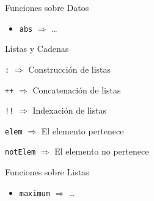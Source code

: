 \begin{frame}[fragile]{Funciones sobre Datos}
    \begin{itemize}
        \item \verb|abs| $\Rightarrow$ \dots
    \end{itemize}
\end{frame}

\begin{frame}[fragile]{Listas y Cadenas}
    \item \verb|:| $\Rightarrow$ Construcción de listas
    \item \verb|++| $\Rightarrow$ Concatenación de listas
    \item \verb|!!| $\Rightarrow$ Indexación de listas
    \item \verb|elem| $\Rightarrow$ El elemento pertenece
    \item \verb|notElem| $\Rightarrow$ El elemento no pertenece
\end{frame}

\begin{frame}[fragile]{Funciones sobre Listas}
    \begin{itemize}
        \item \verb|maximum| $\Rightarrow$ \dots
    \end{itemize}
\end{frame}

